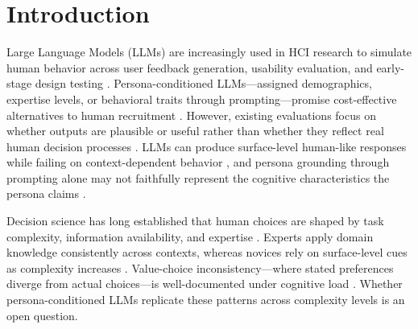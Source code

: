 \documentclass[manuscript,review]{acmart}
\begin{document}


\maketitle

\section{Introduction}
Large Language Models (LLMs) are increasingly used in HCI research to simulate human behavior across user feedback generation, usability evaluation, and early-stage design testing \cite{hamalainen2023synthetichci, park2023generativeagents}. Persona-conditioned LLMs---assigned demographics, expertise levels, or behavioral traits through prompting---promise cost-effective alternatives to human recruitment \cite{argyle2023out, aher2023usinglargelanguagemodels}. However, existing evaluations focus on whether outputs are plausible or useful rather than whether they reflect real human decision processes \cite{hamalainen2023synthetichci, salminen2025syntheticusers}. LLMs can produce surface-level human-like responses while failing on context-dependent behavior \cite{santurkar}, and persona grounding through prompting alone may not faithfully represent the cognitive characteristics the persona claims \cite{aher2023usinglargelanguagemodels, shanahans}.

Decision science has long established that human choices are shaped by task complexity, information availability, and expertise \cite{payne1993adaptive}. Experts apply domain knowledge consistently across contexts, whereas novices rely on surface-level cues as complexity increases \cite{payne1993adaptive}. Value-choice inconsistency---where stated preferences diverge from actual choices---is well-documented under cognitive load \cite{Tversky}. Whether persona-conditioned LLMs replicate these patterns across complexity levels is an open question.
\end{document}
